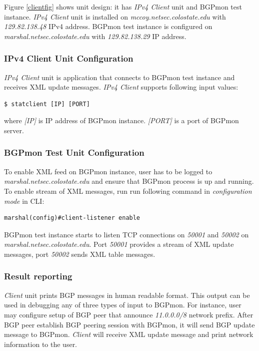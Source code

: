 Figure \ref{clientfig} shows unit design: it has \emph{IPv4 Client} unit and BGPmon test instance. \emph{IPv4 Client} unit is installed on \emph{mccoy.netsec.colostate.edu} with \emph{129.82.138.48} IPv4 address.  BGPmon test instance is configured on \emph{marshal.netsec.colostate.edu} with \emph{129.82.138.29} IP address. 


\subsubsection{IPv4 Client Unit Configuration}

\emph{IPv4 Client} unit is application that connects to BGPmon test instance and receives XML update messages.    \emph{IPv4 Client} supports following input values:

\begin{verbatim}
$ statclient [IP] [PORT]
\end{verbatim}

where \emph{[IP]} is IP address of BGPmon instance. \emph{[PORT]} is a port of BGPmon server.


\subsubsection{BGPmon Test Unit Configuration}

To enable  XML feed on BGPmon instance, user has to be logged to \emph{marshal.netsec.colostate.edu} and ensure that BGPmon process is up and running.  To enable stream of XML messages, run   run following command in \emph{configuration mode} in  CLI:

\begin{verbatim}
marshal(config)#client-listener enable
\end{verbatim}

BGPmon test instance starts  to listen TCP connections on \emph{50001} and \emph{50002} on \emph{marshal.netsec.colostate.edu}. Port \emph{50001} provides a stream of XML update messages, port \emph{50002} sends XML table messages.

\subsubsection{Result reporting}

\emph{Client} unit prints BGP messages in human readable format. This output can be used in debugging any of three types of input to BGPmon.  For instance, user may configure setup of BGP peer that announce \emph{11.0.0.0/8} network prefix. After BGP peer establish BGP peering session with BGPmon, it will send BGP update message to BGPmon. \emph{Client} will receive XML update message and print network information to the user. 